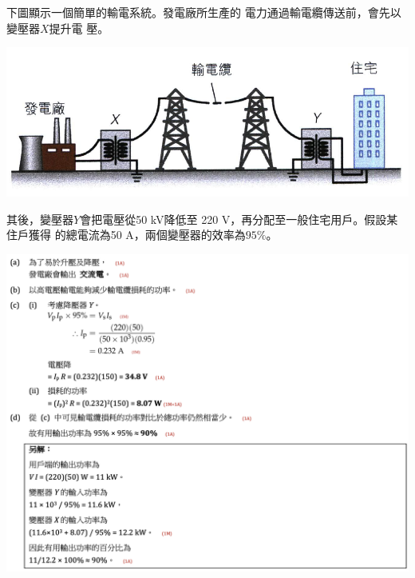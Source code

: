 {
    下圖顯示一個簡單的輸電系統。發電廠所生產的 電力通過輸電纜傳送前，會先以變壓器$X$提升電 壓。
    \par{\par\centering\includegraphics[width=.5\textwidth]{./img/ch_ACtransformer_lq_2024-06-17-20-14-49.png}\par}
    其後，變壓器$Y$會把電壓從50 kV降低至 220 V，再分配至一般住宅用戶。假設某住戶獲得 的總電流為50 A，兩個變壓器的效率為$95\%$。
    \clearpage
}{
    \par{\par\centering\includegraphics[width=\textwidth]{./img/ch_ACtransformer_lq_2024-06-17-20-40-01.png}\par}
}

